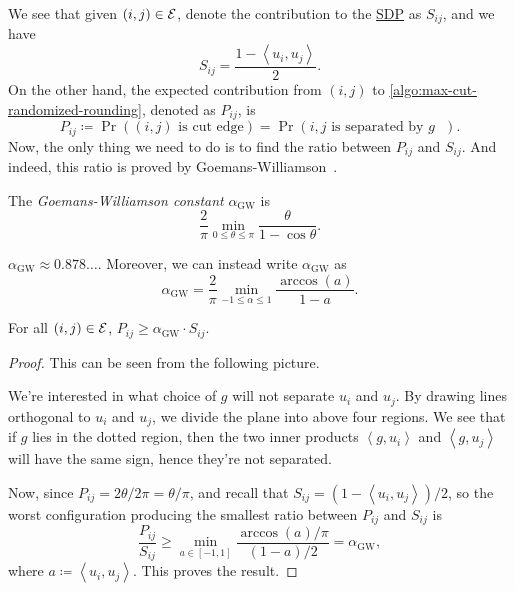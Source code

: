 We see that given \((i, j)\in \mathcal{\MakeUppercase{e}} \), denote the contribution to the \hyperref[eq:max-cut]{SDP} as \(S_{ij} \), and we have
\[
	S_{ij}= \frac{1 - \left\langle u_i, u_j \right\rangle }{2}.
\]
On the other hand, the expected contribution from \((i, j)\) to \autoref{algo:max-cut-randomized-rounding}, denoted as \(P_{ij} \), is
\[
	P_{ij}\coloneqq  \Pr((i, j)\text{ is cut edge} ) = \Pr(i, j \text{ is separated by \(g\) } ).
\]
Now, the only thing we need to do is to find the ratio between \(P_{ij} \) and \(S_{ij} \). And indeed, this ratio is proved by Goemans-Williamson~\cite{goemans1995improved}.

\begin{notation}
	The \emph{Goemans-Williamson constant} \(\alpha _{\mathrm{GW} }\) is
	\[
		\frac{2}{\pi }\min _{0 \leq \theta \leq \pi }\frac{\theta }{1 - \cos \theta }.
	\]
\end{notation}

\begin{remark}
	\(\alpha _{\mathrm{GW} }\approx 0.878\ldots \). Moreover, we can instead write \(\alpha _\mathrm{GW} \) as
	\[
		\alpha _{\mathrm{GW} } = \frac{2}{\pi }\min _{-1\leq \alpha \leq 1} \frac{\arccos(a)}{1 - a}.
	\]
\end{remark}

\begin{lemma}\label{lma:lec14-2}
	For all \((i, j)\in \mathcal{\MakeUppercase{e}} \), \(P_{ij} \geq \alpha _{\mathrm{GW} } \cdot S_{ij} \).
\end{lemma}
\begin{proof}
	This can be seen from the following picture.
	\begin{center}
	\end{center}
	We're interested in what choice of \(g\) will not separate \(u_i\) and \(u_j\). By drawing lines orthogonal to \(u_i\) and \(u_j\), we divide the plane into above four regions. We see that if \(g\) lies in the dotted region, then the two inner products \(\left\langle g, u_i \right\rangle \) and \(\left\langle g, u_j \right\rangle \) will have the same sign, hence they're not separated.

	Now, since \(P_{ij} = 2\theta / 2\pi = \theta / \pi\), and recall that \(S_{ij} = (1 - \left\langle u_i, u_j \right\rangle) / 2 \), so the worst configuration producing the smallest ratio between \(P_{ij} \) and \(S_{ij} \) is
	\[
		\frac{P_{ij}}{S_{ij} } \geq \min _{a\in [-1, 1]} \frac{\arccos(a) / \pi }{(1-a) / 2} = \alpha _\mathrm{GW},
	\]
	where \(a \coloneqq \left\langle u_i, u_j \right\rangle\). This proves the result.
\end{proof}

